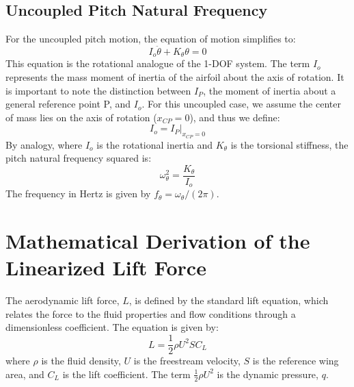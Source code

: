 \documentclass{article}
\begin{document}
\subsection{Uncoupled Pitch Natural Frequency}
For the uncoupled pitch motion, the equation of motion simplifies to:
\begin{equation}
I_o\ddot{\theta} + K_\theta \theta = 0
\label{eq:pitch_uncoupled}
\end{equation}
This equation is the rotational analogue of the 1-DOF system. The term $I_o$ represents the mass moment of inertia of the airfoil about the axis of rotation. It is important to note the distinction between $I_P$, the moment of inertia about a general reference point P, and $I_o$. For this uncoupled case, we assume the center of mass lies on the axis of rotation ($x_{CP}=0$), and thus we define:
\begin{equation}
I_o = I_P \big|_{x_{CP}=0}
\label{eq:inertia_relationship}
\end{equation}
By analogy, where $I_o$ is the rotational inertia and $K_\theta$ is the torsional stiffness, the pitch natural frequency squared is:
\begin{equation}
\omega_\theta^2 = \frac{K_\theta}{I_o}
\label{eq:pitch_natural_freq}
\end{equation}
The frequency in Hertz is given by $f_\theta = \omega_\theta / (2\pi)$.


\newpage
\section{Mathematical Derivation of the Linearized Lift Force}

The aerodynamic lift force, $L$, is defined by the standard lift equation, which relates the force to the fluid properties and flow conditions through a dimensionless coefficient. The equation is given by:
\begin{equation}
    L = \frac{1}{2} \rho U^2 S C_L
    \label{eq:lift_general}
\end{equation}
where $\rho$ is the fluid density, $U$ is the freestream velocity, $S$ is the reference wing area, and $C_L$ is the lift coefficient. The term $\frac{1}{2} \rho U^2$ is the dynamic pressure, $q$.
\end{document}
